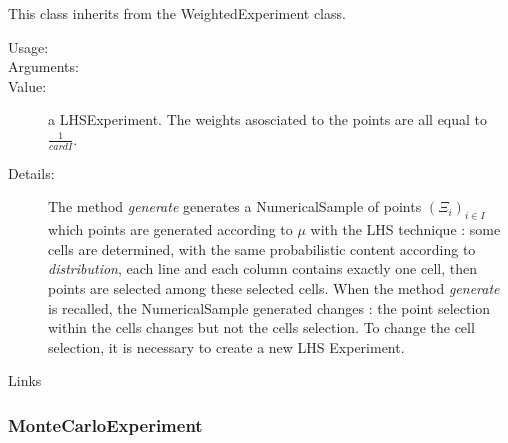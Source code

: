 This class inherits from the WeightedExperiment class.\\

\begin{description}

\item[Usage:] \rule{0pt}{1em}

\item[Arguments:]  \rule{0pt}{1em}

\item[Value:] a LHSExperiment. The weights asosciated to the points are all equal to $\displaystyle \frac{1}{cardI}$.

\item[Details:]  The method \textit{generate} generates a NumericalSample of points  $(\Xi_i)_{i \in I}$ which points are  generated according to $\mu$  with the LHS technique : some cells are determined, with the same probabilistic content according to \textit{distribution}, each line and each column contains exactly one cell, then points are selected among these selected cells. When the method \textit{generate} is recalled, the NumericalSample generated changes  : the point selection within the cells changes but not the cells selection. To change the cell selection, it is necessary to create a new LHS Experiment.

\item[Links] \rule{0pt}{1em}
\end{description}


\newpage
\subsubsection{MonteCarloExperiment}


